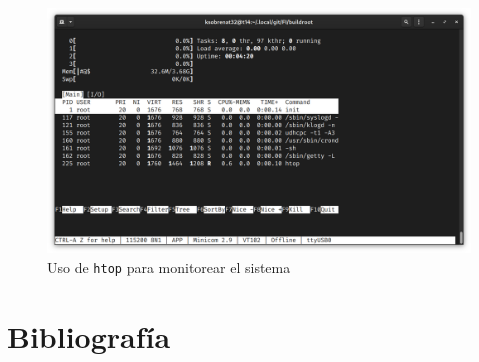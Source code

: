 \documentclass[12pt, letterpaper]{article}
\begin{document}
	\begin{figure}[H]
		\centering
		\begin{center}
			\includegraphics[width=\textwidth]{img/run-example-05}
			\caption{Uso de \texttt{htop} para monitorear el sistema}
			\label{fig:boot}
		\end{center}
	\end{figure}

	\section{Bibliografía}
\end{document}
